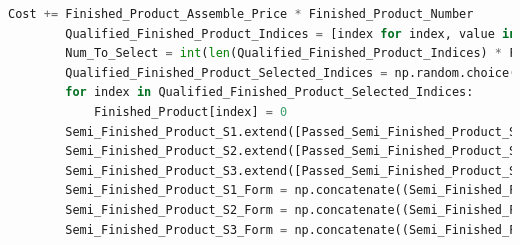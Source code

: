 \documentclass[withoutpreface,bwprint]{cumcmthesis} %
\begin{document}
\begin{appendices}
\begin{lstlisting}[language=python]
		Cost += Finished_Product_Assemble_Price * Finished_Product_Number
		Qualified_Finished_Product_Indices = [index for index, value in enumerate(Finished_Product) if value == 1]
		Num_To_Select = int(len(Qualified_Finished_Product_Indices) * Finished_Product_Defect_Rate)
		Qualified_Finished_Product_Selected_Indices = np.random.choice(Qualified_Finished_Product_Indices, size=Num_To_Select, replace=False)
		for index in Qualified_Finished_Product_Selected_Indices:
			Finished_Product[index] = 0
		Semi_Finished_Product_S1.extend([Passed_Semi_Finished_Product_S1[i] for i in range(len(Passed_Semi_Finished_Product_S1)) if i not in Selected_Indices_Semi_Finished_Product_S1])
		Semi_Finished_Product_S2.extend([Passed_Semi_Finished_Product_S2[i] for i in range(len(Passed_Semi_Finished_Product_S2)) if i not in Selected_Indices_Semi_Finished_Product_S2])
		Semi_Finished_Product_S3.extend([Passed_Semi_Finished_Product_S3[i] for i in range(len(Passed_Semi_Finished_Product_S3)) if i not in Selected_Indices_Semi_Finished_Product_S3])
		Semi_Finished_Product_S1_Form = np.concatenate((Semi_Finished_Product_S1_Form, Passed_Semi_Finished_Product_S1_Form[:, [Passed_Semi_Finished_Product_S1[i] for i in range(len(Passed_Semi_Finished_Product_S1)) if i not in Selected_Indices_Semi_Finished_Product_S1]]), axis=1)
		Semi_Finished_Product_S2_Form = np.concatenate((Semi_Finished_Product_S2_Form, Passed_Semi_Finished_Product_S2_Form[:, [Passed_Semi_Finished_Product_S2[i] for i in range(len(Passed_Semi_Finished_Product_S2)) if i not in Selected_Indices_Semi_Finished_Product_S2]]), axis=1)
		Semi_Finished_Product_S3_Form = np.concatenate((Semi_Finished_Product_S3_Form, Passed_Semi_Finished_Product_S3_Form[:, [Passed_Semi_Finished_Product_S3[i] for i in range(len(Passed_Semi_Finished_Product_S3)) if i not in Selected_Indices_Semi_Finished_Product_S3]]), axis=1)
	

\end{lstlisting}
\end{appendices}
\end{document}
